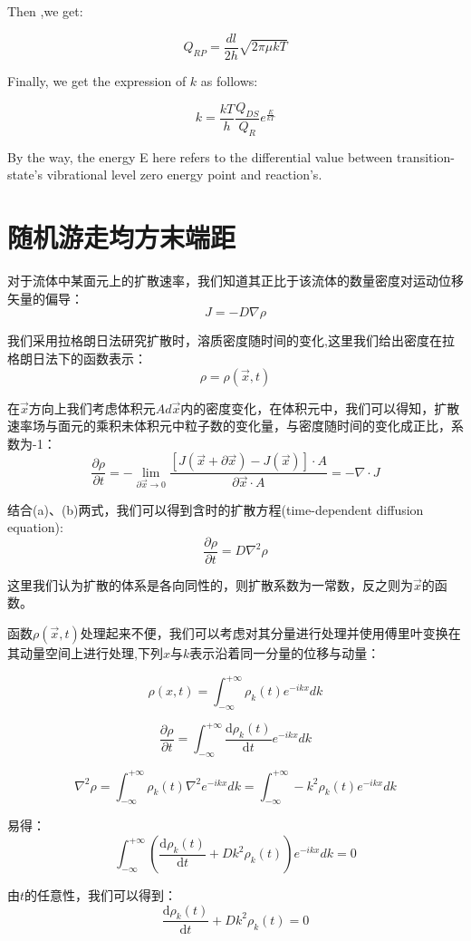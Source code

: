 Then ,we get:

\[Q_{RP}=\frac{dl}{2h}\sqrt{2 \pi \mu kT} \tag{l} \]

Finally, we get the expression of $k$ as follows:

\[k=\frac{kT}{h} \frac{Q_{DS}}{Q_R} e^{\frac{E}{kT}} \tag{*} \]

By the way, the energy E here refers to the differential value between transition-state's vibrational level zero energy point and reaction's.

\section{随机游走均方末端距}
对于流体中某面元上的扩散速率，我们知道其正比于该流体的数量密度对运动位移矢量的偏导：
\[J=-D\nabla\rho \tag{a}\]

我们采用拉格朗日法研究扩散时，溶质密度随时间的变化,这里我们给出密度在拉格朗日法下的函数表示：
\[\rho=\rho(\vec{x},t)\]

在$\vec{x}$方向上我们考虑体积元$Ad\vec{x}$内的密度变化，在体积元中，我们可以得知，扩散速率场与面元的乘积未体积元中粒子数的变化量，与密度随时间的变化成正比，系数为-1：
\[\frac{\partial \rho}{\partial t}=-\lim_{\partial \vec{x} \rightarrow 0} \frac{[J(\vec{x}+\partial \vec{x})-J(\vec{x})] \cdot A}{\partial \vec{x} \cdot A} =-\nabla \cdot J \tag{b}\]

结合(a)、(b)两式，我们可以得到含时的扩散方程(time-dependent diffusion equation):
\[\frac{\partial \rho}{\partial t}=D\nabla^2\rho \tag{c}\]

这里我们认为扩散的体系是各向同性的，则扩散系数为一常数，反之则为$\vec{x}$的函数。

函数$\rho(\vec{x},t)$处理起来不便，我们可以考虑对其分量进行处理并使用傅里叶变换在其动量空间上进行处理,下列$x$与$k$表示沿着同一分量的位移与动量：

\[\rho(x,t)=\int_{-\infty}^{+\infty}\rho_k(t)e^{-ikx}dk\]

\[\frac{\partial \rho}{\partial t}=\int_{-\infty}^{+\infty}\frac{\mathrm{d} \rho_k(t)}{\mathrm dt}e^{-ikx}dk\]

\[\nabla^2\rho=\int_{-\infty}^{+\infty}\rho_k(t)\nabla^2 e^{-ikx}dk=\int_{-\infty}^{+\infty}-k^2\rho_k(t)e^{-ikx}dk\]

易得：
\[\int_{-\infty}^{+\infty}(\frac{\mathrm{d} \rho_k(t)}{\mathrm dt}+Dk^2\rho_k(t))e^{-ikx}dk=0\]

由$t$的任意性，我们可以得到：
\[\frac{\mathrm{d} \rho_k(t)}{\mathrm dt}+Dk^2\rho_k(t)=0 \tag{d}\]

